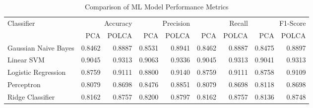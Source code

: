 \begin{table}[htbp]
\caption{Comparison of ML Model Performance Metrics}
\label{tab:model_comparison}
\begin{tabular}{lrrrrrrrr}
\toprule
Classifier & \multicolumn{2}{r}{Accuracy} & \multicolumn{2}{r}{Precision} & \multicolumn{2}{r}{Recall} & \multicolumn{2}{r}{F1-Score} \\
 & PCA & POLCA & PCA & POLCA & PCA & POLCA & PCA & POLCA \\
\midrule
Gaussian Naive Bayes & 0.8462 & 0.8887 & 0.8531 & 0.8941 & 0.8462 & 0.8887 & 0.8475 & 0.8897 \\
Linear SVM & 0.9045 & 0.9313 & 0.9063 & 0.9336 & 0.9045 & 0.9313 & 0.9041 & 0.9313 \\
Logistic Regression & 0.8759 & 0.9111 & 0.8800 & 0.9140 & 0.8759 & 0.9111 & 0.8758 & 0.9109 \\
Perceptron & 0.8079 & 0.8698 & 0.8476 & 0.8851 & 0.8079 & 0.8698 & 0.8118 & 0.8698 \\
Ridge Classifier & 0.8162 & 0.8757 & 0.8200 & 0.8797 & 0.8162 & 0.8757 & 0.8136 & 0.8748 \\
\bottomrule
\end{tabular}
\end{table}
